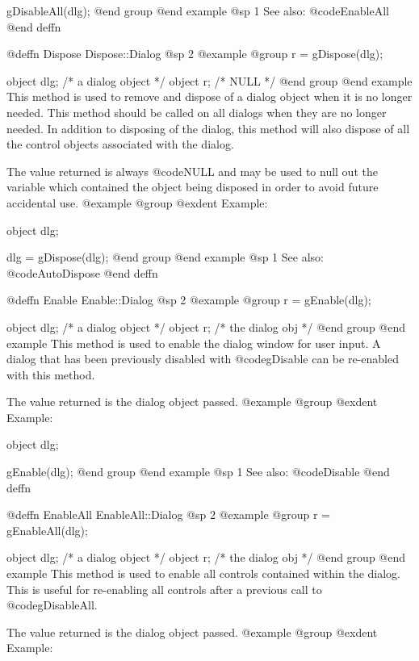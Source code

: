 gDisableAll(dlg);
@end group
@end example
@sp 1
See also:  @code{EnableAll}
@end deffn




@deffn {Dispose} Dispose::Dialog
@sp 2
@example
@group
r = gDispose(dlg);

object  dlg;   /*  a dialog object   */
object  r;     /*  NULL              */
@end group
@end example
This method is used to remove and dispose of a dialog object when it
is no longer needed.  This method should be called on all dialogs
when they are no longer needed.  In addition to disposing of the dialog,
this method will also dispose of all the control objects associated
with the dialog.

The value returned is always @code{NULL} and may be used to null out
the variable which contained the object being disposed in order to
avoid future accidental use.
@example
@group
@exdent Example:

object  dlg;

dlg = gDispose(dlg);
@end group
@end example
@sp 1
See also:  @code{AutoDispose}
@end deffn










@deffn {Enable} Enable::Dialog
@sp 2
@example
@group
r = gEnable(dlg);

object  dlg;   /*  a dialog object  */
object  r;     /*  the dialog obj   */
@end group
@end example
This method is used to enable the dialog window for user input.  A dialog
that has been previously disabled with @code{gDisable} can be re-enabled
with this method.

The value returned is the dialog object passed.
@example
@group
@exdent Example:

object  dlg;

gEnable(dlg);
@end group
@end example
@sp 1
See also:  @code{Disable}
@end deffn




@deffn {EnableAll} EnableAll::Dialog
@sp 2
@example
@group
r = gEnableAll(dlg);

object  dlg;   /*  a dialog object  */
object  r;     /*  the dialog obj   */
@end group
@end example
This method is used to enable all controls contained within the dialog.
This is useful for re-enabling all controls after a previous call to
@code{gDisableAll}.

The value returned is the dialog object passed.
@example
@group
@exdent Example:

